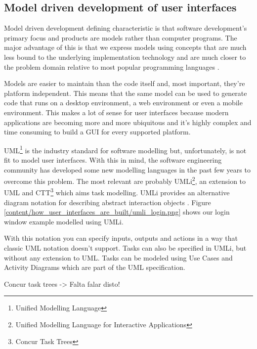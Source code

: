 \subsection{Model driven development of user interfaces}
Model driven development defining characteristic is that software development's primary focus and products are models rather than computer programs. The major advantage of this is that we express models using concepts that are much less bound to the underlying implementation technology and are much closer to the problem domain relative to most popular programming languages \cite{The_Pragmatics_of_Model-Driven_Development}.

Models are easier to maintain than the code itself and, most important, they're platform independent. This means that the same model can be used to generate code that runs on a desktop environment, a web environment or even a mobile environment. This makes a lot of sense for user interfaces because modern applications are becoming more and more ubiquitous and it's highly complex and time consuming to build a GUI for every supported platform.

UML\footnote{Unified Modelling Language} is the industry standard for software modelling but, unfortunately, is not fit to model user interfaces. With this in mind, the software engineering community has developed some new modelling languages in the past few years to overcome this problem. The most relevant are probably UMLi\footnote{Unified Modelling Language for Interactive Applications}, an extension to UML and CTT\footnote{Concur Task Trees} which aims task modelling. UMLi provides an alternative diagram notation for describing abstract interaction objects \cite{User_Interface_Modeling_in_UMLi}. Figure \ref{content/how_user_interfaces_are_built/umli_login.png} shows our login window example modelled using UMLi.

With this notation you can specify inputs, outputs and actions in a way that classic UML notation doesn’t support. Tasks can also be specified in UMLi, but without any extension to UML. Tasks can be modeled using Use Cases and Activity Diagrams which are part of the UML specification.

Concur task trees -> Falta falar disto!